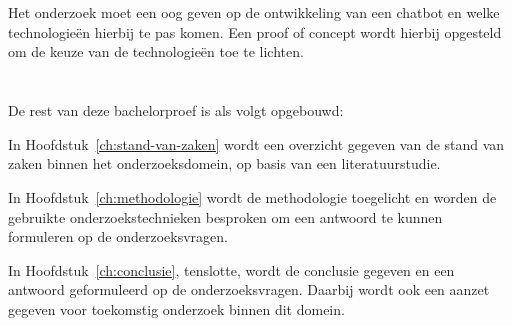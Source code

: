\section{}%
\label{sec:onderzoeksdoelstelling}

Het onderzoek moet een oog geven op de ontwikkeling van een chatbot en welke technologieën hierbij te pas komen. Een proof of concept wordt hierbij opgesteld om de keuze van de technologieën toe te lichten. 


\section{}%
\label{sec:opzet-bachelorproef}


De rest van deze bachelorproef is als volgt opgebouwd:

In Hoofdstuk~\ref{ch:stand-van-zaken} wordt een overzicht gegeven van de stand van zaken binnen het onderzoeksdomein, op basis van een literatuurstudie.

In Hoofdstuk~\ref{ch:methodologie} wordt de methodologie toegelicht en worden de gebruikte onderzoekstechnieken besproken om een antwoord te kunnen formuleren op de onderzoeksvragen.


In Hoofdstuk~\ref{ch:conclusie}, tenslotte, wordt de conclusie gegeven en een antwoord geformuleerd op de onderzoeksvragen. Daarbij wordt ook een aanzet gegeven voor toekomstig onderzoek binnen dit domein.